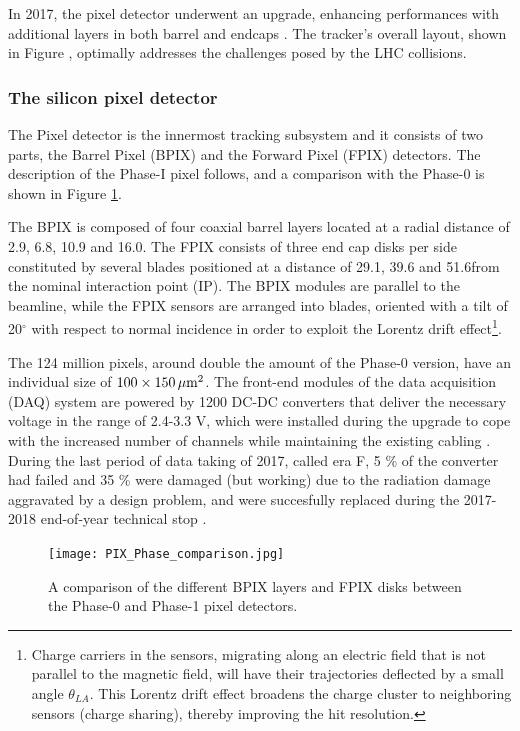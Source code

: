 In 2017, the pixel detector underwent an upgrade, enhancing performances with additional layers in both barrel and endcaps \cite{CMS-TDR-11}.
The tracker's overall layout, shown in Figure , optimally addresses the challenges posed by the LHC collisions.

\subsubsection{The silicon pixel detector}
The Pixel detector is the innermost tracking subsystem and it consists of two parts, the Barrel Pixel (BPIX) and the Forward Pixel (FPIX) detectors.
The description of the Phase-I pixel follows, and a comparison with the Phase-0 is shown in Figure \ref{fig:PIX_Phase_comparison}.

The BPIX is composed of four coaxial barrel layers located at a radial distance of 2.9, 6.8, 10.9 and 16.0\cm.
The FPIX consists of three end cap disks per side constituted by several blades positioned at a distance of 29.1, 39.6 and 51.6\cm from the nominal interaction point (IP).
The BPIX modules are parallel to the beamline, while the FPIX sensors are arranged into blades, oriented with a tilt of 20$^{\circ}$ with respect to normal incidence in order to exploit the Lorentz drift effect\footnote{
Charge carriers in the sensors, migrating along an electric field that is not parallel to the magnetic field, will have their trajectories deflected by a small angle $\theta_{LA}$.
This Lorentz drift effect broadens the charge cluster to neighboring sensors (charge sharing), thereby improving the hit resolution.
}.

The 124 million pixels, around double the amount of the Phase-0 version, have an individual size of $100 \times 150 \,\mu\text{m}^2$.
The front-end modules of the data acquisition (DAQ) system are powered by 1200 DC-DC converters that deliver the necessary voltage in the range of 2.4-3.3 V,
which were installed during the upgrade to cope with the increased number of channels while maintaining the existing cabling \cite{Feld_2015}.
During the last period of data taking of 2017, called era F, 5 \% of the converter had failed and 35 \% were damaged (but working) due to the radiation damage aggravated by a design problem, and were succesfully replaced during the 2017-2018 end-of-year technical stop \cite{CMS:dcdc-failure-short}.

\begin{figure}[thb]
  \centering
  \texttt{[image: PIX\_Phase\_comparison.jpg]}
  \caption{A comparison of the different BPIX layers and FPIX disks between the Phase-0 and Phase-1 pixel detectors.}
  \label{fig:PIX_Phase_comparison}
\end{figure}

